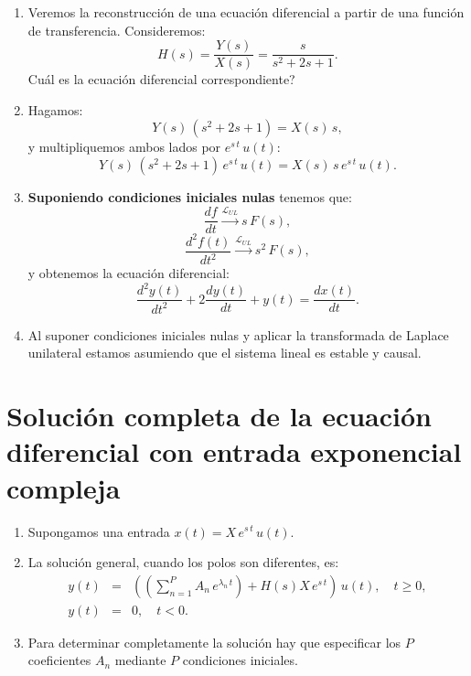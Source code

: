 \begin{enumerate}
	\item Veremos la reconstrucci\'{o}n de una ecuaci\'{o}n diferencial a partir de una funci\'{o}n de transferencia. Consideremos: 
	\begin{equation}
		H\left( s\right) = \frac{Y(s)}{X(s)}=\frac{s}{s^{2}+2s+1}.
	\end{equation}
	\textquestiondown Cu\'{a}l es la ecuaci\'{o}n diferencial correspondiente?
	
	\item Hagamos: 
	\begin{equation}
		Y(s) \, \left( s^{2}+2s+1\right) = X(s) \, s,
	\end{equation}
	y multipliquemos ambos lados por $e^{s \, t} \, u(t)$:
	\begin{equation}
		Y(s) \, \left( s^{2}+2s+1\right) \, e^{s\, t} \, u(t) = X(s) \, s \, e^{s \, t} \, u(t).
	\end{equation}
	
	\item \textbf{Suponiendo condiciones iniciales nulas} tenemos que:
	\begin{equation}
		\frac{df}{dt} \xrightarrow{\mathcal{L}_{UL}} s \, F(s),
	\end{equation}
	\begin{equation}
		\frac{d^{2}f(t)}{dt^{2}} \xrightarrow{\mathcal{L}_{UL}} s^{2} \, F(s),
	\end{equation}
	y obtenemos la ecuaci\'{o}n diferencial: 
	\begin{equation}
		\frac{d^{2}y\left( t\right) }{dt^{2}} + 2\frac{dy\left( t\right) }{dt} + y\left( t\right) = \frac{dx\left( t\right) }{dt}.
	\end{equation}
	
	\item Al suponer condiciones iniciales nulas y aplicar la transformada de Laplace unilateral estamos asumiendo que el sistema lineal es estable y causal.
\end{enumerate}

\section{Soluci\'{o}n completa de la ecuaci\'{o}n diferencial con entrada exponencial compleja}

\begin{enumerate}
	\item Supongamos una entrada $x(t) = X \, e^{s \, t} \, u(t)$.
	\item La soluci\'{o}n general, cuando los polos son diferentes, es: 
	\begin{eqnarray}
		y\left( t\right) &=& \left(\left( \sum_{n=1}^{P}A_{n} \, e^{\lambda_{n} \, t}\right) + H\left( s\right) X \, e^{s \, t}\right) \, u(t), \quad t\geq 0, \\
		y\left( t\right) &=& 0, \quad t<0.
	\end{eqnarray}
	
	\item Para determinar completamente la soluci\'{o}n hay que especificar los $P$ coeficientes $A_{n}$ mediante $P$ condiciones iniciales.
\end{enumerate}

